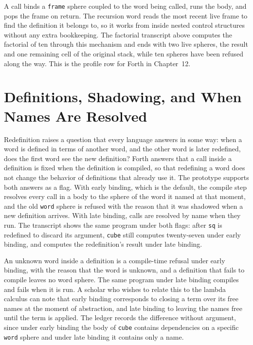 
A call binds a \texttt{frame} sphere coupled to the word being called, runs the body, and pops the frame on return. The recursion word reads the most recent live frame to find the definition it belongs to, so it works from inside nested control structures without any extra bookkeeping. The factorial transcript above computes the factorial of ten through this mechanism and ends with two live spheres, the result and one remaining cell of the original stack, while ten spheres have been refused along the way. This is the profile row for Forth in Chapter~12.


\section{Definitions, Shadowing, and When Names Are Resolved}

Redefinition raises a question that every language answers in some way: when a word is defined in terms of another word, and the other word is later redefined, does the first word see the new definition? Forth answers that a call inside a definition is fixed when the definition is compiled, so that redefining a word does not change the behavior of definitions that already use it. The prototype supports both answers as a flag. With early binding, which is the default, the compile step resolves every call in a body to the sphere of the word it named at that moment, and the old \texttt{word} sphere is refused with the reason that it was shadowed when a new definition arrives. With late binding, calls are resolved by name when they run. The transcript shows the same program under both flags: after \texttt{sq} is redefined to discard its argument, \texttt{cube} still computes twenty-seven under early binding, and computes the redefinition's result under late binding.

An unknown word inside a definition is a compile-time refusal under early binding, with the reason that the word is unknown, and a definition that fails to compile leaves no word sphere. The same program under late binding compiles and fails when it is run. A scholar who wishes to relate this to the lambda calculus can note that early binding corresponds to closing a term over its free names at the moment of abstraction, and late binding to leaving the names free until the term is applied. The ledger records the difference without argument, since under early binding the body of \texttt{cube} contains dependencies on a specific \texttt{word} sphere and under late binding it contains only a name.

